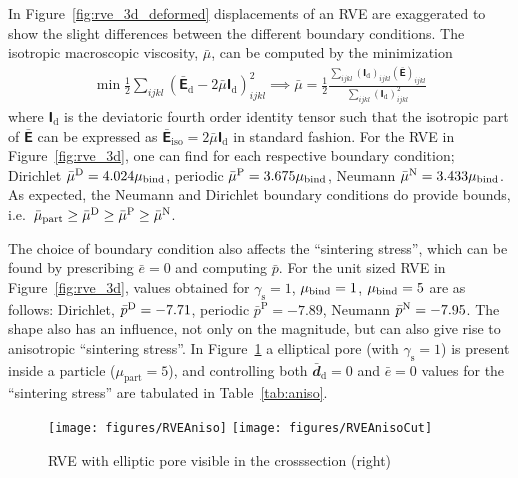 \documentclass[12pt,a4paper]{article}
\renewcommand{\ts}[1]{\mathbfit{#1}}
\renewcommand{\tf}[1]{\mathbfsfup{#1}}
\newcommand{\figref}[1]{Figure~\ref{#1}}
\renewcommand{\dev}{\mathrm{d}}
\newcommand{\ded}{\mathrm{d}}
\newcommand{\Periodic}{\mathrm{P}}
\newcommand{\surf}{\mathrm{s}}
\newcommand{\particle}{\mathrm{part}}
\begin{document}

In \figref{fig:rve_3d_deformed} displacements of an RVE are exaggerated to show the slight differences between the different boundary conditions.
The isotropic macroscopic viscosity, $\bar{\mu}$, can be computed by the minimization
\begin{align}
 \min \frac12 \sum_{ijkl} (\bar{\tf E}_\ded - 2 \bar{\mu} \tf I_\dev)_{ijkl}^2 \implies \bar{\mu} = \frac12 \frac{\sum_{ijkl}(\tf I_\dev)_{ijkl}(\bar{\tf E})_{ijkl}}{\sum_{ijkl} (\tf I_\dev)_{ijkl}^2}
\end{align}
where $\tf I_\dev$ is the deviatoric fourth order identity tensor such that the isotropic part of $\bar{\tf E}$ can be expressed as $\bar{\tf E}_{\mathrm{iso}} = 2 \bar{\mu} \tf I_\dev$ in standard fashion.
For the RVE in \figref{fig:rve_3d}, one can find for each respective boundary condition; Dirichlet $\bar{\mu}^{\mathrm{D}} = 4.024 \mu_{\mathrm{bind}}$, periodic $\bar{\mu}^\Periodic = 3.675\mu_\binder$, Neumann $\bar{\mu}^{\mathrm{N}} = 3.433\mu_{\mathrm{bind}}$.
As expected, the Neumann and Dirichlet boundary conditions do provide bounds, i.e.\ $\bar{\mu}_\particle \geq \bar{\mu}^\Dirichlet \geq \bar{\mu}^\Periodic \geq \bar{\mu}^\Neumann$.

The choice of boundary condition also affects the ``sintering stress'', which can be found by prescribing $\bar{e} = 0$ and computing $\bar{p}$.
For the unit sized RVE in \figref{fig:rve_3d}, values obtained for $\gamma_\surf = 1$, $\mu_{\mathrm{bind}} = 1$, $\mu_{\mathrm{bind}} = 5$ are as follows:
Dirichlet, $\bar{p}^{\mathrm{D}} = -7.71$, periodic $\bar{p}^\Periodic = -7.89$, Neumann $\bar{p}^{\mathrm{N}} = -7.95$.
The shape also has an influence, not only on the magnitude, but can also give rise to anisotropic ``sintering stress''.
In \figref{fig:aniso} a elliptical pore (with $\gamma_\surf = 1$) is present inside a particle ($\mu_\particle = 5$), and controlling both $\bar{\ts d}_\dev = \ts 0$ and $\bar{e} = 0$ values for the ``sintering stress'' are tabulated in Table~\ref{tab:aniso}.

\begin{figure}[htbp!]
 \centering
 \texttt{[image: figures/RVEAniso]}
 \texttt{[image: figures/RVEAnisoCut]}
 \caption{RVE with elliptic pore visible in the crosssection (right)}
 \label{fig:aniso}
\end{figure}
\end{document}
